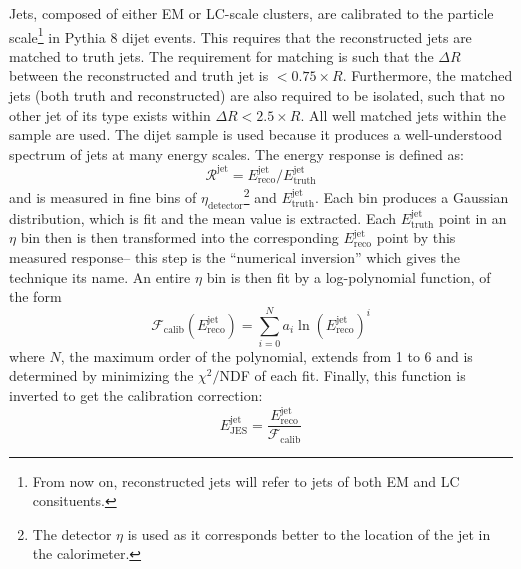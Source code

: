 Jets, composed of either EM or LC-scale clusters, are calibrated to the particle scale\footnote{From now on, reconstructed jets will refer to jets of both EM and LC consituents.} in Pythia 8 dijet events. This requires that the reconstructed jets are matched to truth jets. The requirement for matching is such that the $\Delta R$ between the reconstructed and truth jet is $<0.75\times R$. Furthermore, the matched jets (both truth and reconstructed) are also required to be isolated, such that no other jet of its type exists within $\Delta R < 2.5\times R$. All well matched jets within the sample are used. The dijet sample is used because it produces a well-understood spectrum of jets at many energy scales. The energy response is defined as:
%
\begin{equation}
\mathcal{R}^{\mathrm{jet}} = E^{\mathrm{jet}}_{\mathrm{reco}} /  E^{\mathrm{jet}}_{\mathrm{truth}} 
\end{equation}
%
and is measured in fine bins of $\eta_{\mathrm{detector}}$\footnote{The detector $\eta$ is used as it corresponds better to the location of the jet in the calorimeter.} and $E^{\mathrm{jet}}_{\mathrm{truth}}$. Each bin produces a Gaussian distribution, which is fit and the mean value is extracted. Each $E^{\mathrm{jet}}_{\mathrm{truth}}$ point in an $\eta$ bin then is then transformed into the corresponding $E^{\mathrm{jet}}_{\mathrm{reco}}$ point by this measured response-- this step is the ``numerical inversion'' which gives the technique its name. An entire $\eta$ bin is then fit by a log-polynomial function, of the form
%
\begin{equation}
\mathcal{F}_\mathrm{calib}\left(E^{\mathrm{jet}}_{\mathrm{reco}}\right) = \sum_{i=0}^N a_i \ln \left( E^{\mathrm{jet}}_{\mathrm{reco}} \right)^i
\end{equation}
%
where $N$, the maximum order of the polynomial, extends from 1 to 6 and is determined by minimizing the $\chi^2/$NDF of each fit. Finally, this function is inverted to get the calibration correction:
%
\begin{equation}
E^{\mathrm{jet}}_{\mathrm{JES}} = \frac{E^{\mathrm{jet}}_{\mathrm{reco}}}{\mathcal{F}_\mathrm{calib}}
\end{equation}
%


